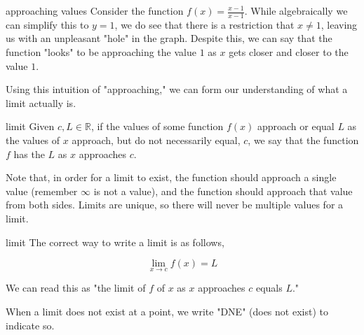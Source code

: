 \begin{example}{approaching values}
    Consider the function \( f \left( x \right) = \frac{x - 1}{x - 1} \). While algebraically we can simplify this to \( y = 1 \), we do see that there is a restriction that \( x \ne 1 \), leaving us with an unpleasant "hole" in the graph. Despite this, we can say that the function "looks" to be approaching the value \( 1 \) as \( x \) gets closer and closer to the value \( 1 \).
    
    \begin{center}
    \end{center}
\end{example}

Using this intuition of "approaching," we can form our understanding of what a limit actually is.

\begin{definition}{limit}
    Given \( c, L \in \mathbb{R} \), if the values of some function \( f \left( x \right) \) approach or equal \( L \) as the values of \( x \) approach, but do not necessarily equal, \( c \), we say that the function \( f \) has the  \( L \) as \( x \) approaches \( c \).
    
    \vspace{0.3cm}
    
    Note that, in order for a limit to exist, the function should approach a single value (remember \( \infty \) is not a value), and the function should approach that value from both sides. Limits are unique, so there will never be multiple values for a limit.
\end{definition}

\begin{notation}{limit}
    The correct way to write a limit is as follows,
    
    \[ \lim_{x \to c} f \left( x \right) = L \]
    
    We can read this as "the limit of \( f \) of \( x \) as \( x \) approaches \( c \) equals \( L \)."
    
    When a limit does not exist at a point, we write "DNE" (does not exist) to indicate so.
\end{notation}

